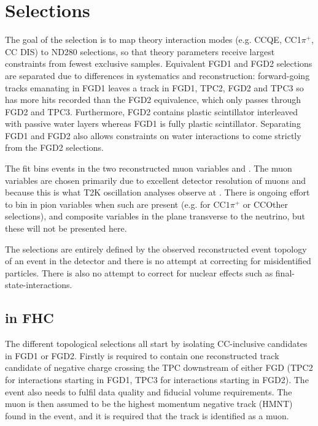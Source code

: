 \section{Selections}
\label{sec:ND280:sel}
The goal of the selection is to map theory interaction modes (e.g. CCQE, CC1$\pi^+$, CC DIS) to ND280 selections, so that theory parameters receive largest constraints from fewest exclusive samples. Equivalent FGD1 and FGD2 selections are separated due to differences in systematics and reconstruction: forward-going tracks emanating in FGD1 leaves a track in FGD1, TPC2, FGD2 and TPC3 so has more hits recorded than the FGD2 equivalence, which only passes through FGD2 and TPC3. Furthermore, FGD2 contains plastic scintillator interleaved with passive water layers whereas FGD1 is fully plastic scintillator. Separating FGD1 and FGD2 also allows constraints on water interactions to come strictly from the FGD2 selections.

The fit bins events in the two reconstructed muon variables \pmu and \cosmu. The muon variables are chosen primarily due to excellent detector resolution of muons and because this is what T2K oscillation analyses observe at \sk. There is ongoing effort to bin in pion variables when such are present (e.g. for CC$1\pi^+$ or CCOther selections), and composite variables in the plane transverse to the neutrino, but these will not be presented here.

The selections are entirely defined by the observed reconstructed event topology of an event in the detector and there is no attempt at correcting for misidentified particles. There is also no attempt to correct for nuclear effects such as final-state-interactions.

\subsection{\numu in FHC}
\label{sec:numu_sel}
The different topological selections all start by isolating CC-inclusive candidates in FGD1 or FGD2. Firstly is required to contain one reconstructed track candidate of negative charge crossing the TPC downstream of either FGD (TPC2 for interactions starting in FGD1, TPC3 for interactions starting in FGD2). The event also needs to fulfil data quality and fiducial volume requirements. The muon is then assumed to be the highest momentum negative track (HMNT) found in the event, and it is required that the track is identified as a muon.

